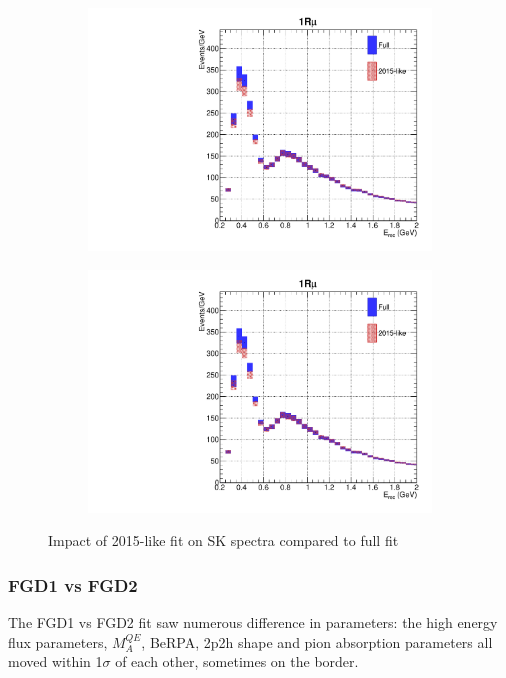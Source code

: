 \begin{figure}[h]
	\begin{subfigure}[t]{0.32\textwidth}
		\includegraphics[width=\textwidth, trim={0mm 0mm 0mm 0mm}, clip, page=4]{figures/mach3/data/alt/try_2017_fit_on_sk_spectra_posterior_sk_error_2015like_spectra}
	\end{subfigure}
	\begin{subfigure}[t]{0.32\textwidth}
		\includegraphics[width=\textwidth, trim={0mm 0mm 0mm 0mm}, clip, page=5]{figures/mach3/data/alt/try_2017_fit_on_sk_spectra_posterior_sk_error_2015like_spectra}
	\end{subfigure}

\caption{Impact of 2015-like fit on SK spectra compared to full fit}
\label{fig:sk_2015like}
\end{figure}

\subsubsection{FGD1 vs FGD2}
The FGD1 vs FGD2 fit saw numerous difference in parameters: the high energy flux parameters, $M_A^{QE}$, BeRPA, 2p2h shape and pion absorption parameters all moved within 1$\sigma$ of each other, sometimes on the border.

